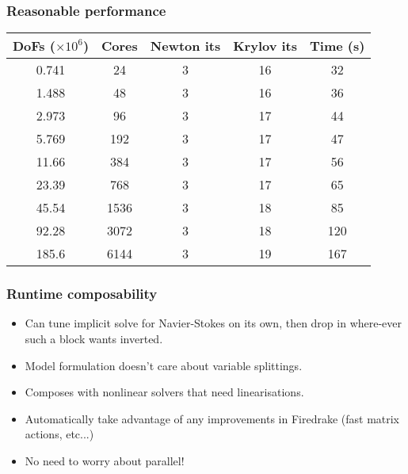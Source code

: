 \documentclass[presentation]{beamer}
\begin{document}
\begin{frame}
  \frametitle{Reasonable performance}
  \small
  \centering
  \begin{tabular}{c|c|c|c|c}
    DoFs ($\times 10^{6}$) & Cores & Newton its & Krylov its & Time (s) \\
    \hline
    0.741                  & 24            & 3          & 16         & 32                   \\
    1.488                  & 48            & 3          & 16         & 36                   \\
    2.973                  & 96            & 3          & 17         & 44                   \\
    5.769                  & 192           & 3          & 17         & 47                   \\
    11.66                  & 384           & 3          & 17         & 56                   \\
    23.39                  & 768           & 3          & 17         & 65                   \\
    45.54                  & 1536          & 3          & 18         & 85                   \\
    92.28                  & 3072          & 3          & 18         & 120                  \\
    185.6                  & 6144          & 3          & 19         & 167                  \\
  \end{tabular}
  
\end{frame}
\begin{frame}
  \frametitle{Runtime composability}

  \begin{itemize}
  \item Can tune implicit solve for Navier-Stokes on its own, then
    drop in where-ever such a block wants inverted.

  \item Model formulation doesn't care about variable
    splittings.

  \item Composes with nonlinear solvers that need linearisations.

  \item Automatically take advantage of any improvements in Firedrake
    (fast matrix actions, etc...)

  \item No need to worry about parallel!
  \end{itemize}
\end{frame}
\end{document}
